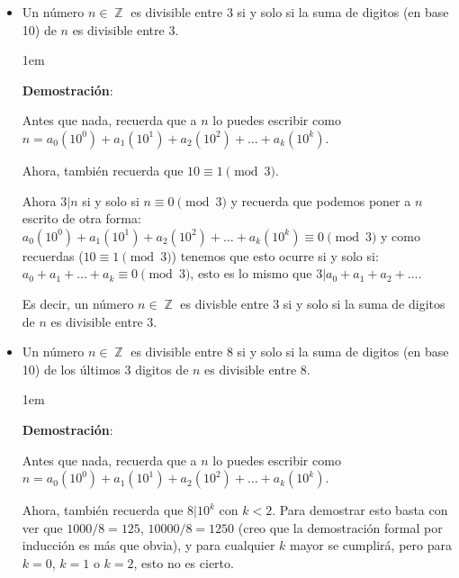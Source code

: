 \documentclass[12pt, fleqn]{report}                             %
\newenvironment{SmallIndentation}[1][0.75em]                    %
    {\begin{adjustwidth}{#1}{}\begin{footnotesize}}                 %
    {\end{footnotesize}\end{adjustwidth}}                           %
\DeclareMathOperator \Integers  {\mathbb{Z}}                     %
\begin{document}
            \begin{itemize}

                \item Un número $n \in \Integers$ es divisible entre 3 si y solo si
                    la suma de digitos (en base 10) de $n$ es divisible entre 3.

                    \begin{SmallIndentation}[1em]
                        \textbf{Demostración}:

                        Antes que nada, recuerda que a $n$ lo puedes escribir como
                        $n = a_0(10^0) + a_1(10^1) + a_2(10^2) + \dots + a_k(10^k)$.

                        Ahora, también recuerda que $10 \equiv 1 \pmod{3}$.

                        Ahora $3|n$ si y solo si $n \equiv 0 \pmod{3}$ y recuerda
                        que podemos poner a $n$ escrito de otra forma:
                        $a_0(10^0) + a_1(10^1) + a_2(10^2) + \dots + a_k(10^k) \equiv 0 \pmod{3}$
                        y como recuerdas ($10 \equiv 1 \pmod{3}$) tenemos que esto ocurre
                        si y solo si:  $a_0 + a_1 +\dots +a_k \equiv 0 \pmod{3}$, esto es lo mismo que
                        $3|a_0+a_1+a_2+\dots$.

                        Es decir, un número $n \in \Integers$ es divisble entre 3 si y solo si
                        la suma de digitos de $n$ es divisible entre 3.

                    \end{SmallIndentation}


                \item Un número $n \in \Integers$ es divisible entre 8 si y solo si
                    la suma de digitos (en base 10) de los últimos 3 digitos de $n$ es divisible
                    entre 8.

                    \begin{SmallIndentation}[1em]
                        \textbf{Demostración}:

                        Antes que nada, recuerda que a $n$ lo puedes escribir como
                        $n = a_0(10^0) + a_1(10^1) + a_2(10^2) + \dots + a_k(10^k)$.

                        Ahora, también recuerda que $8 |10^k$ con $k<2$.
                        Para demostrar esto basta con ver que $1000/8 = 125$, 
                        $10000/8 = 1250$ (creo que la demostración formal por inducción
                        es más que obvia), y para cualquier $k$ mayor se cumplirá,
                        pero para $k=0$, $k=1$ o $k=2$, esto no es cierto.


\end{SmallIndentation}
\end{itemize}
\end{document}
